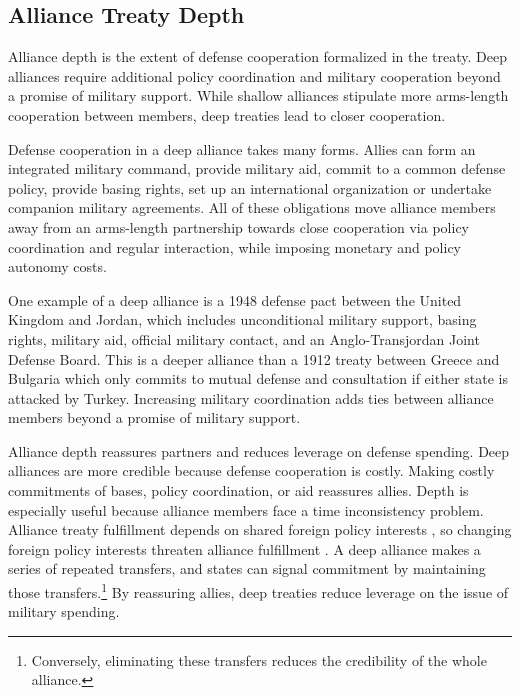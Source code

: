 \documentclass[12pt]{article}
\begin{document}
\subsection{Alliance Treaty Depth} 


Alliance depth is the extent of defense cooperation formalized in the treaty. 
Deep alliances require additional policy coordination and military cooperation beyond a promise of military support. 
While shallow alliances stipulate more arms-length cooperation between members, deep treaties lead to closer cooperation. 


Defense cooperation in a deep alliance takes many forms. 
Allies can form an integrated military command, provide military aid, commit to a common defense policy, provide basing rights, set up an international organization or undertake companion military agreements. 
All of these obligations move alliance members away from an arms-length partnership towards close cooperation via policy coordination and regular interaction, while imposing monetary and policy autonomy costs. 

 
One example of a deep alliance is a 1948 defense pact between the United Kingdom and Jordan, which includes unconditional military support, basing rights, military aid, official military contact, and an Anglo-Transjordan Joint Defense Board.  
This is a deeper alliance than a 1912 treaty between Greece and Bulgaria which only commits to mutual defense and consultation if either state is attacked by Turkey. 
Increasing military coordination adds ties between alliance members beyond a promise of military support.


Alliance depth reassures partners and reduces leverage on defense spending.  
Deep alliances are more credible because defense cooperation is costly. 
Making costly commitments of bases, policy coordination, or aid reassures allies. 
Depth is especially useful because alliance members face a time inconsistency problem. 
Alliance treaty fulfillment depends on shared foreign policy interests \citep{Morrow2000, Leeds2003a}, so changing foreign policy interests threaten alliance fulfillment \citep{LeedsSavun2007}. 
A deep alliance makes a series of repeated transfers, and states can signal commitment by maintaining those transfers.\footnote{Conversely, eliminating these transfers reduces the credibility of the whole alliance.} 
By reassuring allies, deep treaties reduce leverage on the issue of military spending. 
\end{document}
